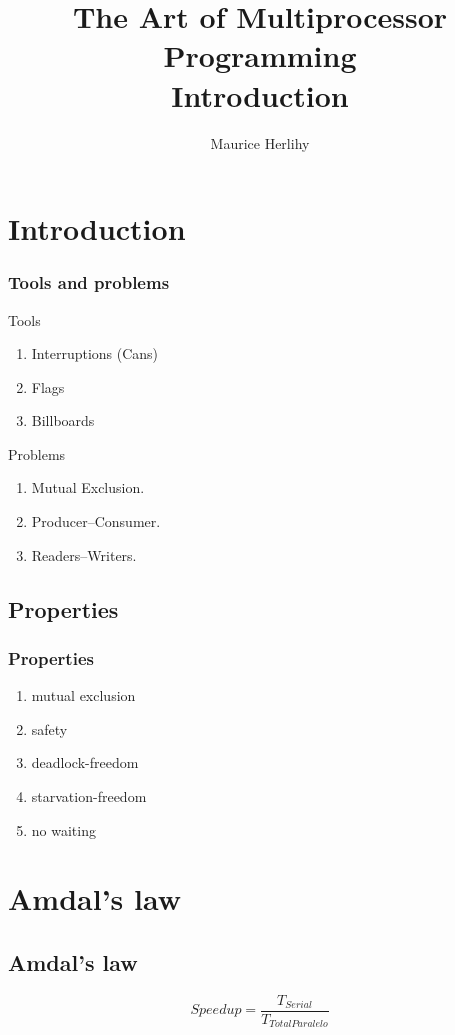 \documentclass[hyperref={pdfpagelabels=false}]{beamer}
\title{The Art of Multiprocessor
Programming\\Introduction }
\author{Maurice Herlihy}
\begin{document}
\begin{frame}
\titlepage
\end{frame} 


 
\section{Introduction} 
\begin{frame}
\frametitle{Tools and problems}

\begin{block}{Tools}
\begin{enumerate}
\item Interruptions (Cans)
\pause 
\item Flags
\pause 
\item Billboards
\pause
\end{enumerate}
\end{block}

\begin{block}{Problems}
\begin{enumerate}
\item Mutual Exclusion.
\pause
\item Producer–Consumer.
\pause
\item Readers–Writers.
\end{enumerate}
\end{block}
\end{frame}


\subsection{Properties}
\begin{frame}
\frametitle{Properties} 
\begin{enumerate}
\item mutual exclusion
\pause
\item safety
\pause
\item deadlock-freedom
\pause
\item starvation-freedom
\pause
\item no waiting
\end{enumerate}
\end{frame}


\section{Amdal's law} 
\subsection{Amdal's law}
\begin{frame}
$$ Speedup =  \frac{T_{Serial}}{T_{TotalParalelo}} $$
\end{frame}
\end{document}
